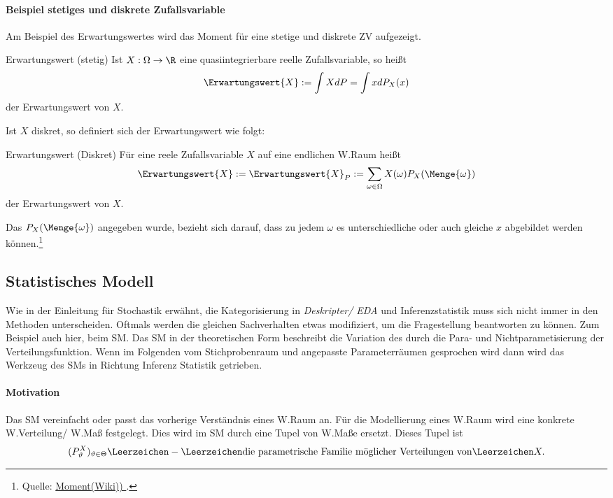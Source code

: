 \paragraph{Beispiel stetiges und diskrete Zufallsvariable} \label{paragraph: Erwartungswert} 
Am Beispiel des Erwartungswertes wird das Moment für eine stetige und diskrete \gls{ZV} aufgezeigt.
\begin{Definition}{Erwartungswert (stetig)}
Ist $X: \Omega \rightarrow \R$ eine quasiintegrierbare reelle Zufallsvariable, so heißt
\begin{align*}
	\Erwartungswert{X} := \int XdP = \int xd P_X(x)
\end{align*}
der Erwartungswert von $X$.
\end{Definition}

Ist $X$ diskret, so definiert sich der Erwartungswert wie folgt:
\begin{Definition}{Erwartungswert (Diskret)}
	Für eine reele Zufallsvariable $X$ auf eine endlichen \gls{W.}Raum \WRaum heißt
	\begin{align*}
		\Erwartungswert{X}:= \Erwartungswert{X}_P := \sum_{\omega\in\Omega} X(\omega)P_X(\Menge{\omega})
	\end{align*}
	der Erwartungswert von $X$.
\end{Definition}
Das $P_X(\Menge{\omega})$ angegeben wurde, bezieht sich darauf, dass zu jedem $\omega$ es unterschiedliche oder auch gleiche $x$ abgebildet werden können.\footnote{
	Quelle: \href{
		https://de.wikipedia.org/wiki/Moment{\_}(Stochastik)
	}{
		Moment(Wiki))
	}.
}
\subsection{Statistisches Modell}

Wie in der Einleitung für Stochastik erwähnt, die Kategorisierung in \textit{Deskripter/ \gls{EDA}} und Inferenzstatistik muss sich nicht immer in den Methoden unterscheiden. Oftmals werden die gleichen Sachverhalten etwas modifiziert, um die Fragestellung beantworten zu können. Zum Beispiel auch hier, beim \gls{SM}. Das \gls{SM} in der theoretischen Form beschreibt die Variation des \WRaum durch die Para- und Nichtparametisierung der Verteilungsfunktion. Wenn im Folgenden vom Stichprobenraum und angepasste Parameterräumen gesprochen wird dann wird das Werkzeug des \gls{SM}s in Richtung Inferenz Statistik getrieben.


\paragraph{Motivation}
Das \gls{SM} vereinfacht oder passt das vorherige Verständnis eines \gls{W.}Raum an.
Für die Modellierung eines \gls{W.}Raum wird eine konkrete \gls{W.}Verteilung/ \gls{W.}Maß festgelegt. Dies wird im \gls{SM} durch eine Tupel von \gls{W.}Maße ersetzt. Dieses Tupel ist 
\begin{align*}
(P^X_{\vartheta})_{\vartheta\in\Theta}\Leerzeichen - \Leerzeichen \text{die parametrische Familie möglicher Verteilungen von}\Leerzeichen X.
\end{align*}

